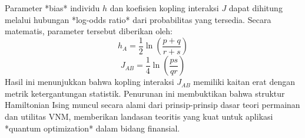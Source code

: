 \documentclass[12pt]{article}
\begin{document}
Parameter *bias* individu $h$ dan koefisien kopling interaksi $J$ dapat dihitung melalui hubungan *log-odds ratio* dari probabilitas yang tersedia. Secara matematis, parameter tersebut diberikan oleh:
\begin{equation}
h_A = \frac{1}{2}\ln\left(\frac{p+q}{r+s}\right) \tag{6}
\end{equation}
\begin{equation}
J_{AB} = \frac{1}{4}\ln\left(\frac{ps}{qr}\right) \tag{7}
\end{equation}
Hasil ini menunjukkan bahwa kopling interaksi $J_{AB}$ memiliki kaitan erat dengan metrik ketergantungan statistik. Penurunan ini membuktikan bahwa struktur Hamiltonian Ising muncul secara alami dari prinsip-prinsip dasar teori permainan dan utilitas VNM, memberikan landasan teoritis yang kuat untuk aplikasi *quantum optimization* dalam bidang finansial.
\end{document}
